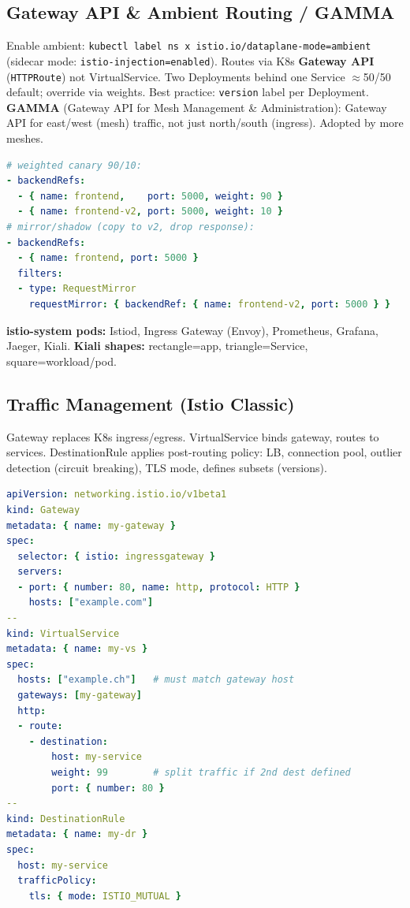 \subsection{Gateway API \& Ambient Routing / GAMMA}
Enable ambient: \texttt{kubectl label ns x istio.io/dataplane-mode=ambient} (sidecar mode: \texttt{istio-injection=enabled}). Routes via K8s \textbf{Gateway API} (\texttt{HTTPRoute}) not VirtualService. Two Deployments behind one Service $\approx$50/50 default; override via weights. Best practice: \texttt{version} label per Deployment. \\
\textbf{GAMMA} (Gateway API for Mesh Management \& Administration): Gateway API for east/west (mesh) traffic, not just north/south (ingress). Adopted by more meshes.
\begin{lstlisting}[language=yaml]
# weighted canary 90/10:
- backendRefs:
  - { name: frontend,    port: 5000, weight: 90 }
  - { name: frontend-v2, port: 5000, weight: 10 }
# mirror/shadow (copy to v2, drop response):
- backendRefs:
  - { name: frontend, port: 5000 }
  filters:
  - type: RequestMirror
    requestMirror: { backendRef: { name: frontend-v2, port: 5000 } }
\end{lstlisting}
\textbf{istio-system pods:} Istiod, Ingress Gateway (Envoy), Prometheus, Grafana, Jaeger, Kiali. \textbf{Kiali shapes:} rectangle=app, triangle=Service, square=workload/pod.

\subsection{Traffic Management (Istio Classic)}
Gateway replaces K8s ingress/egress. VirtualService binds gateway, routes to services. DestinationRule applies post-routing policy: LB, connection pool, outlier detection (circuit breaking), TLS mode, defines subsets (versions).
\begin{lstlisting}[language=yaml]
apiVersion: networking.istio.io/v1beta1
kind: Gateway
metadata: { name: my-gateway }
spec:
  selector: { istio: ingressgateway }
  servers:
  - port: { number: 80, name: http, protocol: HTTP }
    hosts: ["example.com"]
--
kind: VirtualService
metadata: { name: my-vs }
spec:
  hosts: ["example.ch"]   # must match gateway host
  gateways: [my-gateway]
  http:
  - route:
    - destination:
        host: my-service
        weight: 99        # split traffic if 2nd dest defined
        port: { number: 80 }
--
kind: DestinationRule
metadata: { name: my-dr }
spec:
  host: my-service
  trafficPolicy:
    tls: { mode: ISTIO_MUTUAL }
\end{lstlisting}

